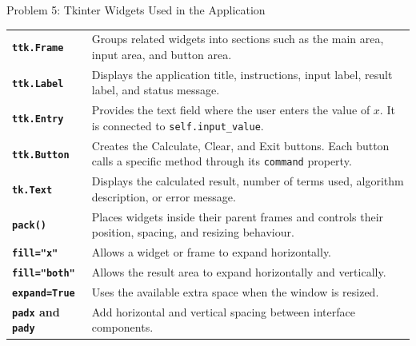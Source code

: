 \documentclass[aspectratio=169,11pt]{beamer}
\begin{document}
\begin{frame}[t]{Problem 5: Tkinter Widgets Used in the Application}
\scriptsize

\renewcommand{\arraystretch}{1.25}
\begin{tabular}{>{\bfseries}p{}p{}}

\texttt{ttk.Frame} &
Groups related widgets into sections such as the main area,
input area, and button area. \\

\texttt{ttk.Label} &
Displays the application title, instructions, input label,
result label, and status message. \\

\texttt{ttk.Entry} &
Provides the text field where the user enters the value of $x$.
It is connected to \texttt{self.input\_value}. \\

\texttt{ttk.Button} &
Creates the Calculate, Clear, and Exit buttons. Each button
calls a specific method through its \texttt{command} property. \\

\texttt{tk.Text} &
Displays the calculated result, number of terms used, algorithm
description, or error message. \\

\texttt{pack()} &
Places widgets inside their parent frames and controls their
position, spacing, and resizing behaviour. \\

\texttt{fill="x"} &
Allows a widget or frame to expand horizontally. \\

\texttt{fill="both"} &
Allows the result area to expand horizontally and vertically. \\

\texttt{expand=True} &
Uses the available extra space when the window is resized. \\

\texttt{padx} and \texttt{pady} &
Add horizontal and vertical spacing between interface components. \\

\end{tabular}
\end{frame}


\end{document}
